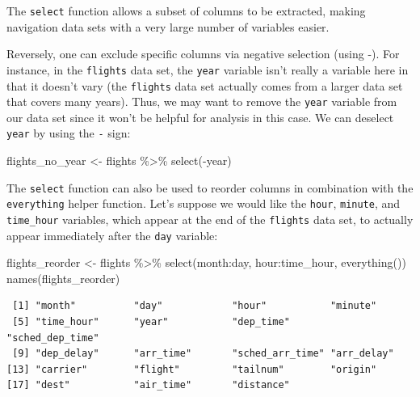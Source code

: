 \documentclass[
  letterpaper,
  DIV=11,
  numbers=noendperiod]{scrartcl}
\newenvironment{Shaded}{\begin{snugshade}}{\end{snugshade}}
\newcommand{\FunctionTok}[1]{\textcolor[rgb]{0.28,0.35,0.67}{#1}}
\newcommand{\NormalTok}[1]{\textcolor[rgb]{0.00,0.23,0.31}{#1}}
\newcommand{\OtherTok}[1]{\textcolor[rgb]{0.00,0.23,0.31}{#1}}
\newcommand{\SpecialCharTok}[1]{\textcolor[rgb]{0.37,0.37,0.37}{#1}}
\begin{document}
The \texttt{select} function allows a subset of columns to be extracted,
making navigation data sets with a very large number of variables
easier.

Reversely, one can exclude specific columns via negative selection
(using -). For instance, in the \texttt{flights} data set, the
\texttt{year} variable isn't really a variable here in that it doesn't
vary (the \texttt{flights} data set actually comes from a larger data
set that covers many years). Thus, we may want to remove the
\texttt{year} variable from our data set since it won't be helpful for
analysis in this case. We can deselect \texttt{year} by using the
\texttt{-} sign:

\begin{Shaded}
\begin{Highlighting}[]
\NormalTok{flights\_no\_year }\OtherTok{\textless{}{-}}\NormalTok{ flights  }\SpecialCharTok{\%\textgreater{}\%} \FunctionTok{select}\NormalTok{(}\SpecialCharTok{{-}}\NormalTok{year)}
\end{Highlighting}
\end{Shaded}

The \texttt{select} function can also be used to reorder columns in
combination with the \texttt{everything} helper function. Let's suppose
we would like the \texttt{hour}, \texttt{minute}, and
\texttt{time\_hour} variables, which appear at the end of the
\texttt{flights} data set, to actually appear immediately after the
\texttt{day} variable:

\begin{Shaded}
\begin{Highlighting}[]
\NormalTok{flights\_reorder }\OtherTok{\textless{}{-}}\NormalTok{ flights }\SpecialCharTok{\%\textgreater{}\%}
  \FunctionTok{select}\NormalTok{(month}\SpecialCharTok{:}\NormalTok{day, hour}\SpecialCharTok{:}\NormalTok{time\_hour, }\FunctionTok{everything}\NormalTok{())}
\FunctionTok{names}\NormalTok{(flights\_reorder)}
\end{Highlighting}
\end{Shaded}

\begin{verbatim}
 [1] "month"          "day"            "hour"           "minute"        
 [5] "time_hour"      "year"           "dep_time"       "sched_dep_time"
 [9] "dep_delay"      "arr_time"       "sched_arr_time" "arr_delay"     
[13] "carrier"        "flight"         "tailnum"        "origin"        
[17] "dest"           "air_time"       "distance"      
\end{verbatim}
\end{document}
